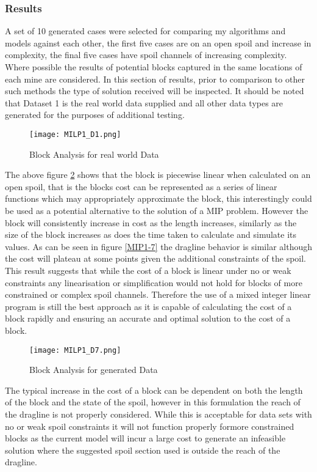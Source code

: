\subsubsection{Results}
A set of 10 generated cases were selected for comparing my algorithms and models against each other, the first five cases are on an open spoil and increase in complexity, the final five cases have spoil channels of increasing complexity. Where possible the results of potential blocks captured in the same locations of each mine are considered. In this section of results, prior to comparison to other such methods the type of solution received will be inspected.	It should be noted that Dataset 1 is the real world data supplied and all other data types are generated for the purposes of additional testing. 
\begin{figure}[h]
\label{MIP1-1}
\caption{Block Analysis for real world Data}
\texttt{[image: MILP1\_D1.png]}
\end{figure}
The above figure \ref{MIP1-1} shows that the block is piecewise linear when calculated on an open spoil, that is the blocks cost can be represented as a series of linear functions which may appropriately approximate the block, this interestingly could be used as a potential alternative to the solution of a MIP problem. However the block will consistently increase in cost as the length increases, similarly as the size of the block increases as does the time taken to calculate and simulate its values. As can be seen in  figure \ref{MIP1-7} the dragline behavior is similar although the cost will plateau at some points given the additional constraints of the spoil. This result suggests that while the cost of a block is linear under no or weak constraints any linearisation or simplification would not hold for blocks of more constrained or complex spoil channels. Therefore the use of a mixed integer linear program is still the best approach as it is capable of calculating the cost of a block rapidly and ensuring an accurate and optimal solution to the cost of a block. 

\begin{figure}[h!]
\label{MIP1-1}
\caption{Block Analysis for generated Data}
\texttt{[image: MILP1\_D7.png]}
\end{figure}
The typical increase in the cost of a block can be dependent on both the length of the block and the state of the spoil, however in this formulation the reach of the dragline is not properly considered. While this is acceptable for data sets with no or weak spoil constraints it will not function properly formore constrained blocks as the current model will incur a large cost to generate an infeasible solution where the suggested spoil section used is outside the reach of the dragline. 
